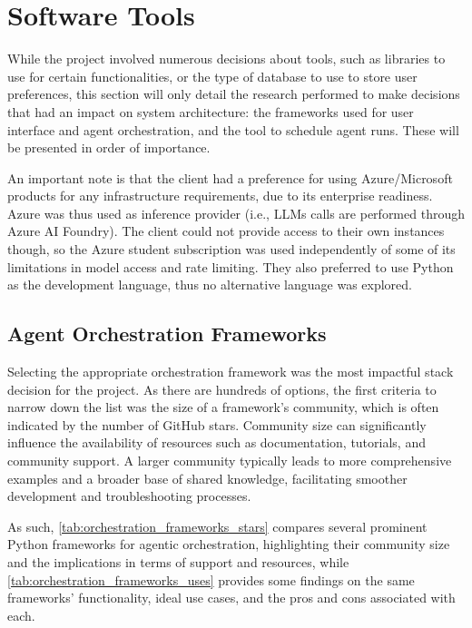 \documentclass[a4paper]{report}
\begin{document}
\section{Software Tools}
\label{sec:research-tools}

While the project involved numerous decisions about tools, such as libraries to use for certain functionalities, or the type of database to use to store user preferences, this section will only detail the research performed to make decisions that had an impact on system architecture: the frameworks used for user interface and agent orchestration, and the tool to schedule agent runs. These will be presented in order of importance.

An important note is that the client had a preference for using Azure/Microsoft products for any infrastructure requirements, due to its enterprise readiness. Azure was thus used as inference provider (i.e., LLMs calls are performed through Azure AI Foundry). The client could not provide access to their own instances though, so the Azure student subscription was used independently of some of its limitations in model access and rate limiting. They also preferred to use Python as the development language, thus no alternative language was explored.

\subsection{Agent Orchestration Frameworks}

Selecting the appropriate orchestration framework was the most impactful stack decision for the project. As there are hundreds of options, the first criteria to narrow down the list was the size of a framework's community, which is often indicated by the number of GitHub stars. Community size can significantly influence the availability of resources such as documentation, tutorials, and community support. A larger community typically leads to more comprehensive examples and a broader base of shared knowledge, facilitating smoother development and troubleshooting processes.

As such, \autoref{tab:orchestration_frameworks_stars} compares several prominent Python frameworks for agentic orchestration, highlighting their community size and the implications in terms of support and resources, while \autoref{tab:orchestration_frameworks_uses} provides some findings on the same frameworks' functionality, ideal use cases, and the pros and cons associated with each.
\end{document}
